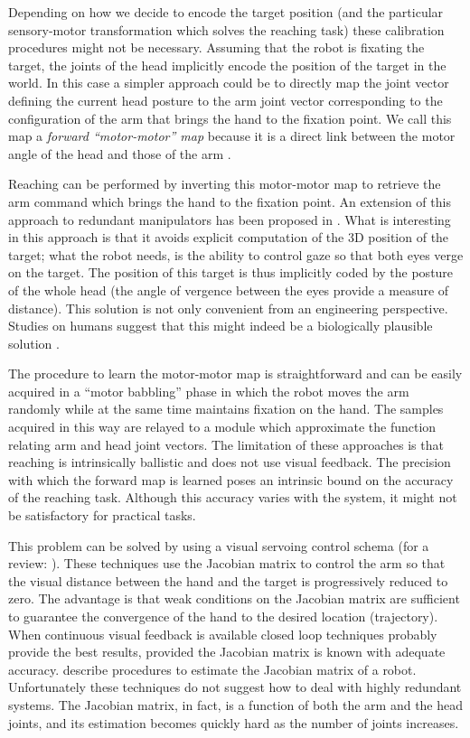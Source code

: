 Depending on how we decide to encode the target position (and the 
particular sensory-motor transformation which solves the reaching task)
these calibration procedures might not be necessary. Assuming that 
the robot is fixating the target, the joints of the head implicitly 
encode the position of the target in the world. In this case a simpler 
approach could be to directly map the joint vector defining the current 
head posture to the arm joint vector corresponding to the configuration 
of the arm that brings the hand to the fixation point. We call this map 
a {\em forward ``motor-motor'' map} because it is a direct link between the motor 
angle of the head and those of the arm 
\cite{blackburn94learning,metta99developmental}. 

Reaching can be performed by inverting this motor-motor 
map to retrieve the arm command which brings the hand to the fixation 
point. An extension of this approach to redundant manipulators has
been proposed in \cite{lopes06learning}. What is interesting in this 
approach is that it avoids explicit computation of the 3D position 
of the target; what the robot needs, is the ability to control gaze
so that both eyes verge on the target. The position of 
this target is thus implicitly coded by the posture of the whole head (the 
angle of vergence between the eyes provide a measure of distance). 
This solution is not only convenient from an engineering perspective. Studies 
on humans suggest that this might indeed be a biologically plausible 
solution \cite{flanders-daghestani-berthoz-1999}.

The procedure to learn the motor-motor map is straightforward and can be 
easily acquired in a ``motor babbling'' phase in which the robot moves 
the arm randomly while at the same time maintains fixation on the hand. 
The samples acquired in this way are relayed to a module which 
approximate the function relating arm and head joint vectors. The 
limitation of these approaches is that reaching
is intrinsically ballistic and does not use visual feedback. The precision 
with which the forward map is learned poses an intrinsic bound on
the accuracy of the reaching task. Although this accuracy varies with the
system, it might not be satisfactory for practical tasks.

This problem can be solved by using a visual servoing control schema (for a 
review: \cite{hutchinson96tutorial}). These techniques use the 
Jacobian matrix to control the arm so that the visual distance between the 
hand and the target is progressively reduced to zero. The advantage is that 
weak conditions on the Jacobian matrix are sufficient to guarantee the convergence 
of the hand to the desired location (trajectory). When continuous visual 
feedback is available closed loop techniques probably provide the best 
results, provided the Jacobian matrix is known with 
adequate accuracy. \cite{Hosoda94versatile,Mansard06jacobian,Lapreste04efficient} 
describe procedures to estimate the Jacobian matrix of a robot. Unfortunately 
these techniques do not suggest how to deal with highly redundant systems.
The Jacobian matrix, in fact, is a function
of both the arm and the head joints, and its estimation becomes
quickly hard as the number of joints increases.

